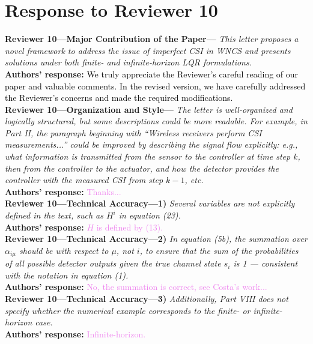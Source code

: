 \section{Response to Reviewer 10}
\begin{bibunit}
\textbf{Reviewer 10---Major Contribution of the Paper---}\textit{%
This letter proposes a novel framework to address the issue of imperfect CSI in WNCS and presents solutions under both finite- and infinite-horizon LQR formulations.}\\[2mm]
\textbf{Authors' response:} \textcolor{black}{We truly appreciate the Reviewer's careful reading of our paper and valuable comments. In the revised version, we have carefully addressed the Reviewer's concerns and made the required modifications.}\\[4mm]
\textbf{Reviewer 10---Organization and Style---}\textit{%
The letter is well-organized and logically structured, but some descriptions could be more readable.
For example, in Part II, the paragraph beginning with ``Wireless receivers perform CSI measurements...'' could be improved by describing the signal flow explicitly: e.g., what information is transmitted from the sensor to the controller at time step $k$, then from the controller to the actuator, and how the detector provides the controller with the measured CSI from step $k-1$, etc.}\\[2mm]
\textbf{Authors' response:} \textcolor{violet}{Thanks...}\\[4mm]
\textbf{Reviewer 10---Technical Accuracy---1)}\textit{%
Several variables are not explicitly defined in the text, such as $H^i$ in equation (23).}\\[2mm]
\textbf{Authors' response:} \textcolor{violet}{$H$ is defined by (13).}\\[4mm]
\textbf{Reviewer 10---Technical Accuracy---2)}\textit{%
In equation (5b), the summation over $\alpha_{i\mu}$ should
be with respect to $\mu$, not $i$, to ensure that the sum of the probabilities of all possible detector outputs given the true channel state $s_i$ is 1 --- consistent with the notation in equation (1).}\\[2mm]
\textbf{Authors' response:} \textcolor{violet}{No, the summation is correct, see Costa's work...}\\[4mm]
\textbf{Reviewer 10---Technical Accuracy---3)}\textit{%
Additionally, Part VIII does not specify whether the numerical example corresponds to the finite- or infinite-horizon case.}\\[2mm]
\textbf{Authors' response:} \textcolor{violet}{Infinite-horizon.}\\[4mm]

\end{bibunit}
